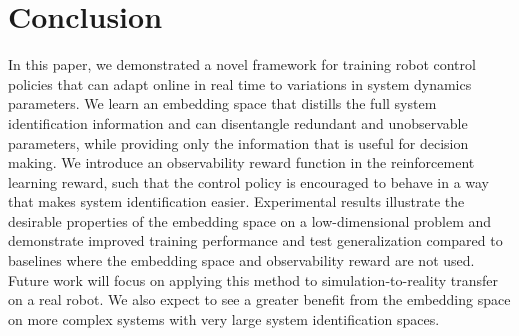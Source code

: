 \documentclass{article}
\begin{document}
\section{Conclusion}
In this paper, we demonstrated a novel framework for training robot control policies
that can adapt online in real time to variations in system dynamics parameters.
We learn an embedding space that distills the full system identification information
and can disentangle redundant and unobservable parameters, while providing only the information that is useful for decision making.
We introduce an observability reward function in the reinforcement learning reward,
such that the control policy is encouraged to behave in a way that makes system identification easier.
Experimental results illustrate the desirable properties of the embedding space on a low-dimensional problem
and demonstrate improved training performance and test generalization compared to baselines
where the embedding space and observability reward are not used.
Future work will focus on applying this method to simulation-to-reality transfer on a real robot.
We also expect to see a greater benefit from the embedding space on more complex systems with very large system identification spaces.

\clearpage
\acknowledgments{}
{}
\end{document}
